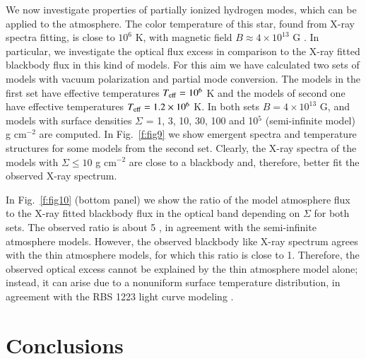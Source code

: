 \documentclass{aa}
\begin{document}
We now investigate properties of partially ionized hydrogen modes,
 which can be applied to the  atmosphere. The color 
temperature of this star,  found from  X-ray spectra fitting, 
is close 
to $10^6$ K, with magnetic field $B\approx 4 \times 10^{13}$ G 
\citep{Swopeetal:07}.  In particular, we investigate the optical flux excess 
in comparison 
to the X-ray fitted blackbody flux in this kind of models. 
 For this aim we have calculated two sets of  
 models with vacuum polarization and partial mode 
conversion. The models in the first set have 
effective temperatures $T_{\rm eff} = 10^6$ K and the models of second one 
have effective temperatures $T_{\rm eff} = 1.2 \times 10^6$ K. In both 
sets $B=4 \times 10^{13}$ G, and models with 
surface densities $\Sigma$ = 1, 3, 10, 30, 100 and 10$^5$ (semi-infinite 
model) g cm$^{-2}$ are computed.  In Fig.~\ref{f:fig9} we show  emergent spectra 
and  temperature structures for some models from the second set. 
Clearly, the X-ray spectra of the models with $\Sigma \le 
10$ g cm$^{-2}$ are close to a blackbody and, therefore, better fit 
the observed X-ray spectrum. 
 
 In Fig.~\ref{f:fig10} (bottom panel) we show 
the ratio of the model 
atmosphere flux to the X-ray fitted blackbody flux in the optical band 
depending on $\Sigma$ for 
both sets. 
The observed ratio is about 5 \citep{Kaplanetal:02b}, in
agreement with the semi-infinite atmosphere models. However, the
observed blackbody like X-ray spectrum agrees with the thin
atmosphere models, for which this ratio is close to 1. Therefore,
the observed optical excess cannot be explained by the thin
atmosphere model alone; instead, it can arise due to a nonuniform
surface temperature distribution, in agreement with the RBS 1223
light curve modeling  \citep{Swopeetal:05}.

 
\section{Conclusions} 
\label{s:conclusions} 
 
\end{document}
